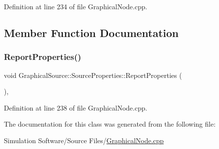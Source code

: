 Definition at line 234 of file Graphical\+Node.\+cpp.



\subsection{Member Function Documentation}
\mbox{\label{class_graphical_source_1_1_source_properties_a186fd47eaec7e6499665c31580d9e3fc}} 
\subsubsection{\texorpdfstring{Report\+Properties()}{ReportProperties()}}
{\footnotesize\ttfamily void Graphical\+Source\+::\+Source\+Properties\+::\+Report\+Properties (\begin{DoxyParamCaption}{ }\end{DoxyParamCaption})\hspace{0.3cm}{\ttfamily [inline]}, {\ttfamily [override]}}



Definition at line 238 of file Graphical\+Node.\+cpp.



The documentation for this class was generated from the following file\+:\begin{DoxyCompactItemize}
\item 
Simulation Software/\+Source Files/\hyperlink{_graphical_node_8cpp}{Graphical\+Node.\+cpp}\end{DoxyCompactItemize}
